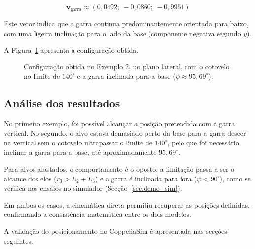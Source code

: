 \begin{equation}
    \mathbf{v}_{\mathrm{garra}}\approx
    (0{,}0492;\ -0{,}0860;\ -0{,}9951)
\end{equation}

Este vetor indica que a garra continua predominantemente orientada para baixo, com uma ligeira inclinação para o lado da base (componente negativa segundo $y$).

A Figura~\ref{fig:exemplo2} apresenta a configuração obtida.

\begin{figure}[H]
    \centering
    \resizebox{0.5\textwidth}{!}{
        
    }
    \caption{Configuração obtida no Exemplo 2, no plano lateral, com o cotovelo no limite de $140^\circ$ e a garra inclinada para a base ($\psi\approx95{,}69^\circ$).}
    \label{fig:exemplo2}
\end{figure}

\subsection{Análise dos resultados}

No primeiro exemplo, foi possível alcançar a posição pretendida com a garra vertical. No segundo, o alvo estava demasiado perto da base para a garra descer na vertical sem o cotovelo ultrapassar o limite de $140^\circ$, pelo que foi necessário inclinar a garra para a base, até aproximadamente $95{,}69^\circ$.

Para alvos afastados, o comportamento é o oposto: a limitação passa a ser o alcance dos elos ($r_3>L_2+L_3$) e a garra é inclinada para fora ($\psi<90^\circ$), como se verifica nos ensaios no simulador (Secção~\ref{sec:demo_sim}).

Em ambos os casos, a cinemática direta permitiu recuperar as posições definidas, confirmando a consistência matemática entre os dois modelos.

A validação do posicionamento no CoppeliaSim é apresentada nas secções seguintes.